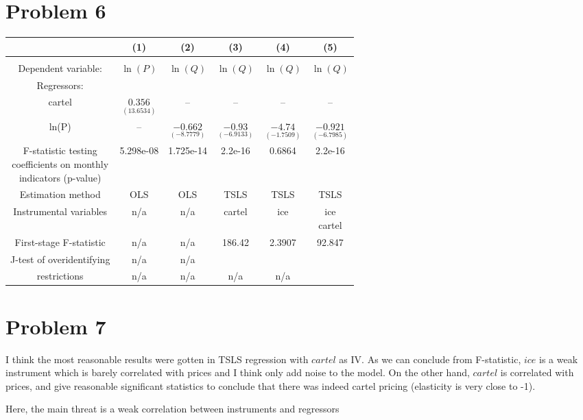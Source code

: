 \documentclass[a4paper]{article}
\begin{document}
\section*{Problem 6}
\begin{center}
\begin{tabular}{cccccc}
	\hline
	& (1) & (2) & (3) & (4) & (5)\\
	\hline\\
	Dependent variable: & $\ln(P)$ & $\ln(Q)$ & $\ln(Q)$ & $\ln(Q)$ & $\ln(Q)$\\
	Regressors:& & & &\\
	cartel & $\underset{(13.6534)}{0.356}$ & – & – & – & –\\
	ln(P) & – & $\underset{(-8.7779)}{-0.662}$ & $\underset{(-6.9133)}{-0.93}$ & $\underset{(-1.7509)}{-4.74}$ &$\underset{(-6.7985)}{-0.921}$\\
	\makecell{F-statistic testing\\
	coefficients on monthly\\
	indicators (p-value)} &5.298e-08 & 1.725e-14&2.2e-16 & 0.6864&2.2e-16\\
	Estimation method & OLS & OLS &TSLS &TSLS &TSLS\\
	Instrumental variables& n/a& n/a& cartel& ice& \makecell{ice\\
	cartel}\\
	First-stage F-statistic& n/a &n/a&186.42&2.3907&92.847\\
	J-test of overidentifying &n/a &n/a&&&\\
	restrictions & n/a &n/a &n/a& n/a
&
\end{tabular}
\end{center}
\section*{Problem 7}
I think the most reasonable results were gotten in TSLS regression with $cartel$ as IV. As we can conclude from F-statistic, $ice$ is a weak instrument which is barely correlated with prices and I think only add noise to the model. On the other hand, $cartel$ is correlated with prices, and give reasonable significant statistics to conclude that there was indeed cartel pricing (elasticity is very close to -1).

Here, the main threat is a weak correlation between instruments and regressors
\end{document}
